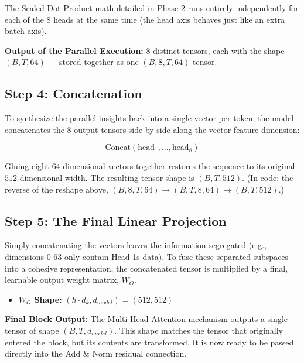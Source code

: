 \documentclass[11pt,a4paper,oneside]{report}
\providecommand{\tightlist}{\setlength{\itemsep}{0pt}\setlength{\parskip}{0pt}}
\begin{document}
The Scaled Dot-Product math detailed in Phase 2 runs entirely independently for each of the 8 heads at the same time (the head axis behaves just like an extra batch axis).

\textbf{Output of the Parallel Execution:} 8 distinct tensors, each with the shape \((B, T, 64)\) --- stored together as one \((B, 8, T, 64)\) tensor.

\subsection{Step 4: Concatenation}\label{step-4-concatenation}

To synthesize the parallel insights back into a single vector per token, the model concatenates the 8 output tensors side-by-side along the vector feature dimension:

\[\text{Concat}(\text{head}_1, \dots, \text{head}_8)\]

Gluing eight \(64\)-dimensional vectors together restores the sequence to its original \(512\)-dimensional width. The resulting tensor shape is \((B, T, 512)\). (In code: the reverse of the reshape above, \((B, 8, T, 64) \rightarrow (B, T, 8, 64) \rightarrow (B, T, 512)\).)

\subsection{Step 5: The Final Linear Projection}\label{step-5-the-final-linear-projection}

Simply concatenating the vectors leaves the information segregated (e.g., dimensions 0-63 only contain Head 1\textquotesingle s data). To fuse these separated subspaces into a cohesive representation, the concatenated tensor is multiplied by a final, learnable output weight matrix, \(W_O\).

\begin{itemize}
\tightlist
\item
  \textbf{\(W_O\) Shape:} \((h \cdot d_k, d_{model}) = (512, 512)\)
\end{itemize}

\begin{center}\end{center}

\textbf{Final Block Output:} The Multi-Head Attention mechanism outputs a single tensor of shape \textbf{\((B, T, d_{model})\)}. This shape matches the tensor that originally entered the block, but its contents are transformed. It is now ready to be passed directly into the Add \& Norm residual connection.
\end{document}
